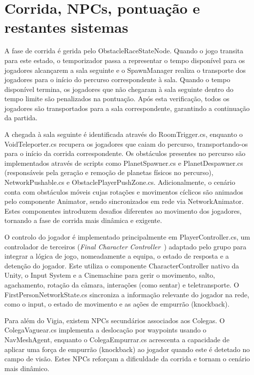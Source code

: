 \section{Corrida, NPCs, pontuação e restantes sistemas}
\label{sec:corridaImpl}

A fase de corrida é gerida pelo ObstacleRaceStateNode. Quando o jogo transita para este estado, o temporizador passa a representar o tempo disponível para os jogadores alcançarem a sala seguinte e o SpawnManager realiza o transporte dos jogadores para o início do percurso correspondente à sala. Quando o tempo disponível termina, os jogadores que não chegaram à sala seguinte dentro do tempo limite são penalizados na pontuação. Após esta verificação, todos os jogadores são transportados para a sala correspondente, garantindo a continuação da partida.

A chegada à sala seguinte é identificada através do RoomTrigger.cs, enquanto o VoidTeleporter.cs recupera os jogadores que caiam do percurso, transportando-os para o início da corrida correspondente. Os obstáculos presentes no percurso são implementados através de scripts como PlanetSpawner.cs e PlanetDespawner.cs (responsáveis pela geração e remoção de planetas físicos no percurso), NetworkPushable.cs e ObstaclePlayerPushZone.cs. Adicionalmente, o cenário conta com obstáculos móveis cujas rotações e movimentos cíclicos são animados pelo componente Animator, sendo sincronizados em rede via NetworkAnimator. Estes componentes introduzem desafios diferentes ao movimento dos jogadores, tornando a fase de corrida mais dinâmica e exigente.

O controlo do jogador é implementado principalmente em PlayerController.cs, um controlador de terceiros (\textit{Final Character Controller}~\cite{GinjaGaming2024}) adaptado pelo grupo para integrar a lógica de jogo, nomeadamente a equipa, o estado de resposta e a detenção do jogador. Este utiliza o componente CharacterController nativo da Unity, o Input System e a Cinemachine para gerir o movimento, salto, agachamento, rotação da câmara, interações (como sentar) e teletransporte. O FirstPersonNetworkState.cs sincroniza a informação relevante do jogador na rede, como o input, o estado de movimento e as ações de empurrão (knockback).

Para além do Vigia, existem NPCs secundários associados aos Colegas. O ColegaVaguear.cs implementa a deslocação por waypoints usando o NavMeshAgent, enquanto o ColegaEmpurrar.cs acrescenta a capacidade de aplicar uma força de empurrão (knockback) ao jogador quando este é detetado no campo de visão. Estes NPCs reforçam a dificuldade da corrida e tornam o cenário mais dinâmico.

